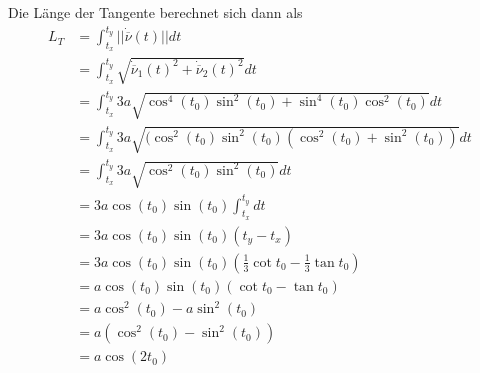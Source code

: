 \documentclass[a4paper,german,12pt,smallheadings]{scrartcl}
\begin{document}
Die Länge der Tangente berechnet sich dann als
\begin{align*}
  L_T &= \int_{t_x}^{t_y} ||\dot{\overline{\nu}}(t)|| dt \\
      &= \int_{t_x}^{t_y} \sqrt{\dot{\overline{\nu}}_1(t)^2 + \dot{\overline{\nu}}_2(t)^2} dt \\
      &= \int_{t_x}^{t_y} 3a \sqrt{\cos^4(t_0)\sin^2(t_0) + \sin^4(t_0) \cos^2(t_0)} dt \\
      &= \int_{t_x}^{t_y} 3a \sqrt{(\cos^2(t_0)\sin^2(t_0) (\cos^2(t_0) + \sin^2(t_0))} dt \\
      &= \int_{t_x}^{t_y} 3a \sqrt{\cos^2(t_0)\sin^2(t_0)} dt \\
      &= 3a \cos(t_0)\sin(t_0) \int_{t_x}^{t_y} dt \\
      &= 3a \cos(t_0)\sin(t_0) (t_y - t_x) \\
      &= 3a \cos(t_0)\sin(t_0) (\frac{1}{3} \cot t_0 - \frac{1}{3} \tan t_0) \\
      &= a \cos(t_0) \sin(t_0) (\cot t_0 - \tan t_0) \\
      &= a \cos^2(t_0) - a \sin^2(t_0) \\
      &= a (\cos^2(t_0) - \sin^2(t_0)) \\
      &= a \cos(2 t_0)
\end{align*}
\end{document}
